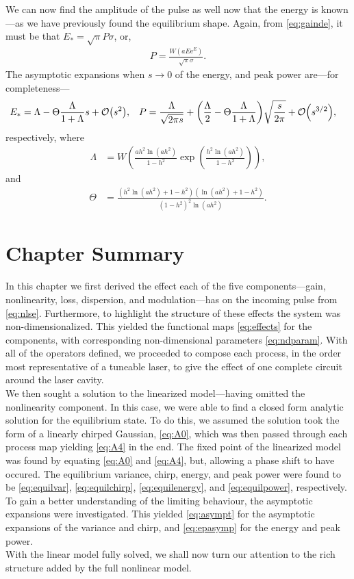 We can now find the amplitude of the pulse as well now that the energy is known---as we have previously found the equilibrium shape. Again, from \eqref{eq:gainde}, it must be that $E_* = \sqrt{\pi} P \sigma$, or,
\begin{align}
P = \frac{W(a E \textrm{e}^E)}{\sqrt{\pi} \sigma}.
\label{eq:equilpower}
\end{align}
The asymptotic expansions when $s \rightarrow 0$ of the energy, and peak power are---for completeness---
\begin{align}
E_* &= \Lambda - \Theta \frac{\Lambda}{1 + \Lambda} s + \bigO{s^2}, & P &= \frac{\Lambda}{\sqrt{2 \pi s}} + \left( \frac{\Lambda}{2} -  \Theta \frac{\Lambda}{1 + \Lambda} \right) \sqrt{\frac{s}{2 \pi}} +  \bigO{s^{3/2}},
\label{eq:epasymp}
\end{align}
respectively, where
\begin{align*}
\Lambda &= W\left( \frac{a h^2 \ln(a h^2)}{1 - h^2} \exp \left( \frac{h^2 \ln(a h^2)}{1 - h^2} \right) \right),
\end{align*}
and
\begin{align*}
\Theta &= \frac{\left( h^2 \ln(a h^2) + 1 - h^2 \right) \left( \ln(a h^2) + 1 - h^2 \right)}{\left( 1 - h^2 \right)^2 \ln(a h^2)}.
\end{align*}

\section{Chapter Summary}
In this chapter we first derived the effect each of the five components---gain, nonlinearity, loss, dispersion, and modulation---has on the incoming pulse from \eqref{eq:nlse}. Furthermore, to highlight the structure of these effects the system was non-dimensionalized. This yielded the functional maps \eqref{eq:effects} for the components, with corresponding non-dimensional parameters \eqref{eq:ndparam}. With all of the operators defined, we proceeded to compose each process, in the order most representative of a tuneable laser, to give the effect of one complete circuit around the laser cavity. \\

We then sought a solution to the linearized model---having omitted the nonlinearity component. In this case, we were able to find a closed form analytic solution for the equilibrium state. To do this, we assumed the solution took the form of a linearly chirped Gaussian, \eqref{eq:A0}, which was then passed through each process map yielding \eqref{eq:A4} in the end. The fixed point of the linearized model was found by equating \eqref{eq:A0} and \eqref{eq:A4}, but, allowing a phase shift to have occured. The equilibrium variance, chirp, energy, and peak power were found to be \eqref{eq:equilvar}, \eqref{eq:equilchirp}, \eqref{eq:equilenergy}, and \eqref{eq:equilpower}, respectively. To gain a better understanding of the limiting behaviour, the asymptotic expansions were investigated. This yielded \eqref{eq:asympt} for the asymptotic expansions of the variance and chirp, and \eqref{eq:epasymp} for the energy and peak power. \\

With the linear model fully solved, we shall now turn our attention to the rich structure added by the full nonlinear model.